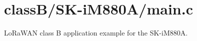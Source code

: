 \hypertarget{class_b_2_s_k-i_m880_a_2main_8c-example}{}\section{class\+B/\+S\+K-\/i\+M880\+A/main.\+c}
Lo\+Ra\+W\+AN class B application example for the S\+K-\/i\+M880A.


\begin{DoxyCodeInclude}
\end{DoxyCodeInclude}
 